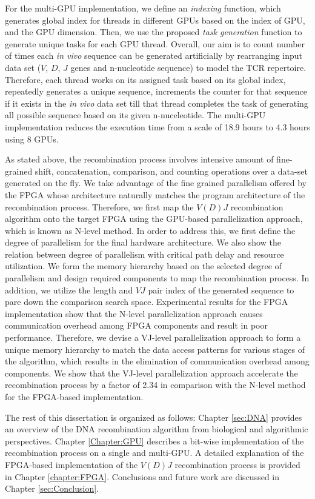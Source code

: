 For the multi-GPU implementation, we define an \emph{indexing} function, which generates global index for threads in different GPUs based on the index of GPU, and the GPU dimension. Then, we use the proposed \emph{task generation} function to generate unique tasks for each GPU thread. Overall, our aim is to count number of times each \emph{in vivo} sequence can be generated artificially by rearranging input data set ($V$, $D$, $J$ genes and n-nucleotide sequence) to model the TCR repertoire. Therefore, each thread works on its assigned task based on its global index, repeatedly generates a unique sequence, increments the counter for that sequence if it exists in the \emph{in vivo} data set till that thread completes the task of generating all possible sequence based on its given n-nuceleotide. The multi-GPU implementation reduces the execution time from a scale of 18.9 hours to 4.3 hours using 8 GPUs.


As stated above, the recombination process involves intensive amount of fine-grained shift, concatenation, comparison, and counting operations over a data-set generated on the fly. We take advantage of the fine grained parallelism offered by the FPGA whose architecture naturally matches the program architecture of the recombination process. Therefore, we first map the $V(D)J$ recombination algorithm onto the target FPGA using the GPU-based parallelization approach, which is known as N-level method. In order to address this, we first define the degree of parallelism for the final hardware architecture. We also show the relation between degree of parallelism with critical path delay and resource utilization. We form the memory hierarchy based on the selected degree of parallelism and design required components to map the recombination process. In addition, we utilize the length and $VJ$ pair index of the generated sequence to pare down the comparison search space. Experimental results for the FPGA implementation show that the N-level parallelization approach causes communication overhead among FPGA components and result in poor performance. Therefore, we devise a VJ-level parallelization approach to form a unique memory hierarchy to match the data access patterns for various stages of the algorithm, which results in the elimination of communication overhead among components. We show that the VJ-level parallelization approach accelerate the recombination process by a factor of 2.34 in comparison with the N-level method for the FPGA-based implementation.

The  rest  of  this  dissertation  is  organized  as  follows:   Chapter \ref{sec:DNA}  provides  an overview  of  the DNA recombination algorithm from biological and algorithmic perspectives. Chapter \ref{Chapter:GPU} describes a bit-wise implementation of the recombination process on a single and multi-GPU. A detailed explanation of the FPGA-based implementation of the $V(D)J$ recombination process is provided in Chapter \ref{chapter:FPGA}. Conclusions and future work are discussed in Chapter \ref{sec:Conclusion}.

%
